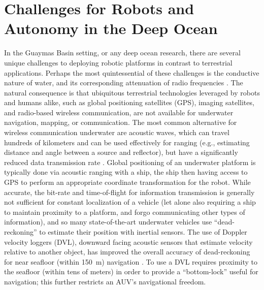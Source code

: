 \section{Challenges for Robots and Autonomy in the Deep Ocean}
\label{sec:ops_challenges}
In the Guaymas Basin setting, or any deep ocean research, there are several unique challenges to deploying robotic platforms in contrast to terrestrial applications. Perhaps the most quintessential of these challenges is the conductive nature of water, and its corresponding attenuation of radio frequencies \autocite{qureshi2016rf}. The natural consequence is that ubiquitous terrestrial technologies leveraged by robots and humans alike, such as global positioning satellites (GPS), imaging satellites, and radio-based wireless communication, are not available for underwater navigation, mapping, or communication. The most common alternative for wireless communication underwater are acoustic waves, which can travel hundreds of kilometers and can be used effectively for ranging (e.g., estimating distance and angle between a source and reflector), but have a significantly reduced data transmission rate \autocite{qureshi2016rf}. Global positioning of an underwater platform is typically done via acoustic ranging with a ship, the ship then having access to GPS to perform an appropriate coordinate transformation for the robot. While accurate, the bit-rate and time-of-flight for information transmission is generally not sufficient for constant localization of a vehicle (let alone also requiring a ship to maintain proximity to a platform, and forgo communicating other types of information), and so many state-of-the-art underwater vehicles use ``dead-reckoning'' to estimate their position with inertial sensors. The use of Doppler velocity loggers (DVL), downward facing acoustic sensors that estimate velocity relative to another object, has improved the overall accuracy of dead-reckoning for near seafloor (within \SI{150}{\meter}) navigation \autocite{stutters2008navigation,liu2022dvl,fong2006evaluation,rigby2006towards}. To use a DVL requires proximity to the seafloor (within tens of meters) in order to provide a ``bottom-lock'' useful for navigation; this further restricts an AUV's navigational freedom.


